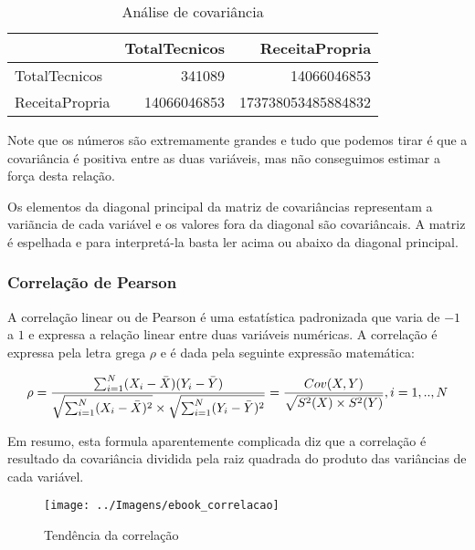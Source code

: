 \documentclass[11pt,]{style/krantz}
\renewenvironment{quote}{\begin{VF}}{\end{VF}}
\theoremstyle{definition}
\theoremstyle{definition}
\theoremstyle{definition}
\theoremstyle{remark}
\begin{document}
\begin{table}[!h]

\caption{\label{tab:unnamed-chunk-103}Análise de covariância}
\centering
\begin{tabular}{lrr}
\toprule
  & TotalTecnicos & ReceitaPropria\\
\midrule
TotalTecnicos & 341089 & 14066046853\\
ReceitaPropria & 14066046853 & 173738053485884832\\
\bottomrule
\end{tabular}
\end{table}

Note que os números são extremamente grandes e tudo que podemos tirar é que a covariância é positiva entre as duas variáveis, mas não conseguimos estimar a força desta relação.

\begin{quote}
Os elementos da diagonal principal da matriz de covariâncias representam a variãncia de cada variável e os valores fora da diagonal são covariâncais.
A matriz é espelhada e para interpretá-la basta ler acima ou abaixo da diagonal principal.
\end{quote}

\hypertarget{correlacao-de-pearson}{%
\subsubsection{Correlação de Pearson}\label{correlacao-de-pearson}}

A correlação linear ou de Pearson é uma estatística padronizada que varia de \(-1\) a \(1\) e expressa a relação linear entre duas variáveis numéricas. A correlação é expressa pela letra grega \(\rho\) e é dada pela seguinte expressão matemática:

\[\rho = \frac {\sum_{i=1}^N(X_i-\bar X)(Y_i - \bar Y)}{\sqrt{\sum_{i=1}^N(X_i-\bar X)^2} \times \sqrt{\sum_{i=1}^N(Y_i-\bar Y)^2}}=\frac{Cov(X,Y)}{\sqrt{S^2(X) \times S^2(Y)}}, \\ i=1,..,N\]

Em resumo, esta formula aparentemente complicada diz que a correlação é resultado da covariância dividida pela raiz quadrada do produto das variâncias de cada variável.

\begin{figure}[H]

{\centering \texttt{[image: ../Imagens/ebook\_correlacao]} 

}

\caption{Tendência da correlação}\label{fig:fig11}
\end{figure}
\end{document}

